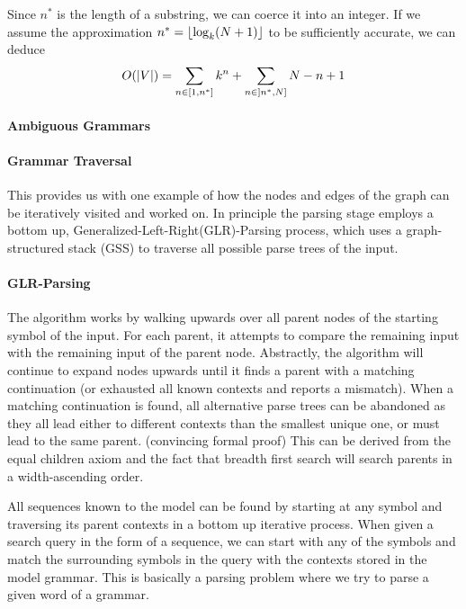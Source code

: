 \noindent
Since $n^*$ is the length of a substring, we can coerce it into an integer. If we assume the approximation $n^* = \lfloor\log_k(N + 1)\rfloor$ to be sufficiently accurate, we can deduce 
\begin{align*}
    O(|V|) = \sum_{n \in \interval{1}{n^*}}{k^n}
    + \sum_{n \in \interval[open left]{n^*}{N}}{N - n + 1}
\end{align*}

\paragraph{Ambiguous Grammars}

\paragraph{Grammar Traversal}
This provides us with one example of how the nodes and edges of the graph can be
iteratively visited and worked on.
In principle the parsing stage employs a bottom up, Generalized-Left-Right(GLR)-Parsing 
process, which uses a graph-structured stack (GSS) to traverse all possible parse trees 
of the input.
%

\paragraph{GLR-Parsing}
The algorithm works by walking upwards over all parent nodes of the starting symbol of 
the input.
For each parent, it attempts to compare the remaining input with the remaining input of 
the parent node.
Abstractly, the algorithm will continue to expand nodes upwards until it finds a parent 
with a matching
continuation (or exhausted all known contexts and reports a mismatch).
When a matching continuation is found, all alternative parse trees can be abandoned as 
they all lead either
to different contexts than the smallest unique one, or must lead to the same parent.
(convincing formal proof)
This can be derived from the equal children axiom and the fact that breadth first search 
will search parents
in a width-ascending order.

All sequences known to the model can be found by starting at any symbol and traversing 
its parent contexts in a bottom up iterative process. When given a search query in the 
form of a sequence, we can start with any of the symbols and match the surrounding 
symbols in the query with the contexts stored in the model grammar. This is basically a 
parsing problem where we try to parse a given word of a grammar.


